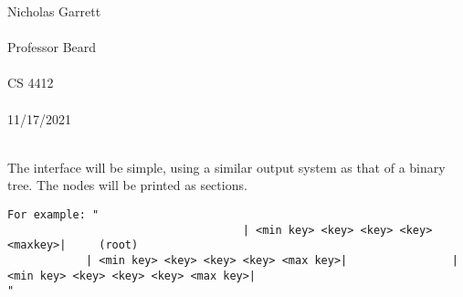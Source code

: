 \documentclass[12pt, a4paper]{article}
\begin{document}
\noindent
Nicholas Garrett\\ \\
Professor Beard\\ \\
CS 4412\\ \\
11/17/2021\\ \\


\begin{center}
\end{center}


The interface will be simple, using a similar output system as that of a binary tree.  The nodes will be printed as sections.  

\begin{verbatim}
For example: " 
									| <min key> <key> <key> <key> <maxkey>|		(root)
			| <min key> <key> <key> <key> <max key>| 				| <min key> <key> <key> <key> <max key>|
"
\end{verbatim}
\end{document}
